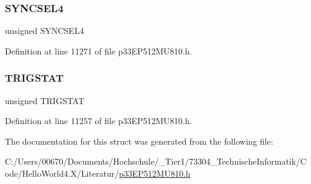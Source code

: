 \subsubsection{\texorpdfstring{S\+Y\+N\+C\+S\+E\+L4}{SYNCSEL4}}
{\footnotesize\ttfamily unsigned S\+Y\+N\+C\+S\+E\+L4}



Definition at line 11271 of file p33\+E\+P512\+M\+U810.\+h.

\mbox{\label{structtag_o_c3_c_o_n2_b_i_t_s_ab379549de54ac93ad4aa73686c34cb7c}} 
\subsubsection{\texorpdfstring{T\+R\+I\+G\+S\+T\+AT}{TRIGSTAT}}
{\footnotesize\ttfamily unsigned T\+R\+I\+G\+S\+T\+AT}



Definition at line 11257 of file p33\+E\+P512\+M\+U810.\+h.



The documentation for this struct was generated from the following file\+:\begin{DoxyCompactItemize}
\item 
C\+:/\+Users/00670/\+Documents/\+Hochschule/\+\_\+\+Tier1/73304\+\_\+\+Technische\+Informatik/\+Code/\+Hello\+World4.\+X/\+Literatur/\hyperlink{p33_e_p512_m_u810_8h}{p33\+E\+P512\+M\+U810.\+h}\end{DoxyCompactItemize}
